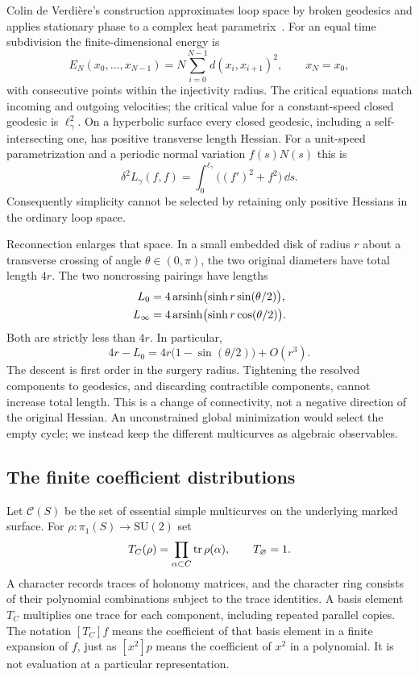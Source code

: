 Colin de Verdi\`ere's construction approximates loop space by broken
geodesics and applies stationary phase to a complex heat
parametrix~\cite{CdVPeriodic}. For an equal time subdivision the
finite-dimensional energy is
\[
 E_N(x_0,\ldots,x_{N-1})
 =N\sum_{i=0}^{N-1}d(x_i,x_{i+1})^2,\qquad x_N=x_0,
\]
with consecutive points within the injectivity radius. The critical
equations match incoming and outgoing velocities; the critical
value for a constant-speed closed geodesic is $\ell_\gamma^2$.
On a hyperbolic surface every closed geodesic, including a
self-intersecting one, has positive transverse length Hessian.
For a unit-speed parametrization and a periodic normal variation
$f(s)N(s)$ this is
\[
 \delta^2L_\gamma(f,f)
 =\int_0^{\ell_\gamma}\bigl((f')^2+f^2\bigr)\,\dd s.
\]
Consequently simplicity cannot be selected by retaining only
positive Hessians in the ordinary loop space.

Reconnection enlarges that space. In a small embedded disk of radius
$r$ about a transverse crossing of angle $\theta\in(0,\pi)$, the two
original diameters have total length $4r$. The two noncrossing
pairings have lengths
\begin{align}
 L_0&=4\operatorname{arsinh}\bigl(\sinh r\sin(\theta/2)\bigr),\notag\\
 L_\infty&=4\operatorname{arsinh}\bigl(\sinh r\cos(\theta/2)\bigr).
 \label{eq:coeffuncrossing}
\end{align}
Both are strictly less than $4r$. In particular,
\[
 4r-L_0=4r\bigl(1-\sin(\theta/2)\bigr)+O(r^3).
\]
The descent is first order in the surgery radius. Tightening the
resolved components to geodesics, and discarding contractible
components, cannot increase total length. This is a change of
connectivity, not a negative direction of the original Hessian.
An unconstrained global minimization would select the empty cycle;
we instead keep the different multicurves as algebraic observables.

\subsection{The finite coefficient distributions}

Let $\mathscr C(S)$ be the set of essential simple multicurves on
the underlying marked surface. For
$\rho:\pi_1(S)\to\mathrm{SU}(2)$ set
\begin{equation}
 T_C(\rho)=\prod_{\alpha\subset C}\operatorname{tr}\rho(\alpha),
 \qquad T_\varnothing=1.
 \label{eq:coeffbasis}
\end{equation}
A character records traces of holonomy matrices, and the character
ring consists of their polynomial combinations subject to the trace
identities. A basis element $T_C$ multiplies one trace for each
component, including repeated parallel copies. The notation $[T_C]f$
means the coefficient of that basis element in a finite expansion
of $f$, just as $[x^2]p$ means the coefficient of $x^2$ in a polynomial.
It is not evaluation at a particular representation.


